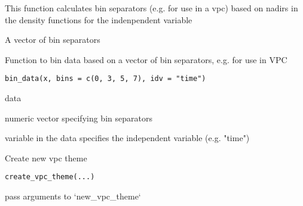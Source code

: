 \documentclass[letterpaper]{book}
\begin{document}
%
\begin{Details}\relax
This function calculates bin separators (e.g. for use in a vpc) based on nadirs in the density functions for the indenpendent variable
\end{Details}
%
\begin{Value}
A vector of bin separators
\end{Value}
%
\begin{SeeAlso}\relax
{}
\end{SeeAlso}
%
\begin{Description}\relax
Function to bin data based on a vector of bin separators, e.g. for use in VPC
\end{Description}
%
\begin{Usage}
\begin{verbatim}
bin_data(x, bins = c(0, 3, 5, 7), idv = "time")
\end{verbatim}
\end{Usage}
%
\begin{Arguments}
\begin{ldescription}
\item[\code{x}] data

\item[\code{bins}] numeric vector specifying bin separators

\item[\code{idv}] variable in the data specifies the independent variable (e.g. "time")
\end{ldescription}
\end{Arguments}
%
\begin{Description}\relax
Create new vpc theme
\end{Description}
%
\begin{Usage}
\begin{verbatim}
create_vpc_theme(...)
\end{verbatim}
\end{Usage}
%
\begin{Arguments}
\begin{ldescription}
\item[\code{...}] pass arguments to `new\_vpc\_theme`
\end{ldescription}
\end{Arguments}
\end{document}
